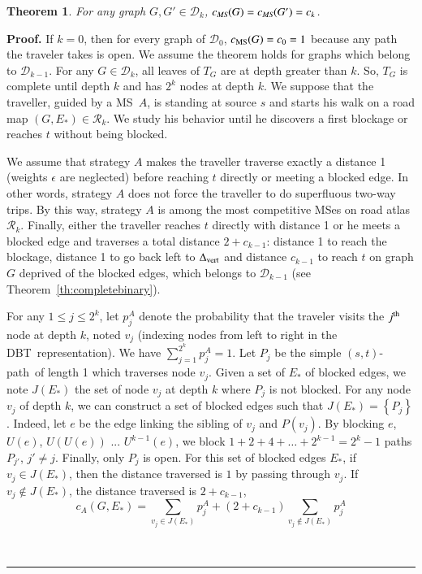 \documentclass[preprint]{elsarticle}
\newtheorem{theorem}{Theorem}
\newenvironment{proof}[1][Proof]{\textbf{#1.} }{\ \rule{0.5em}{0.5em}}
\newcommand{\set}[1]{\left\{ #1 \right\}}
\newcommand{\ith}[1]{#1^{\mbox{\scriptsize{th}}}}
\newcommand{\stpath}{$(s,t)$-path}
\newcommand{\mcalr}{\mathcal{R}}
\newcommand{\mcald}{\mathcal{D}}
\newcommand{\mts}{MS}
\newcommand{\deltavert}{\Delta_{\mbox{\scriptsize{vert}}}}
\newcommand{\cms}{c_{\mbox{\scriptsize{MS}}}}
\newcommand{\ebt}{DBT}
\begin{document}
\begin{theorem}
For any graph $G, G' \in \mcald_k$, $c_{\emph{\scriptsize{MS}}}(G) = c_{\emph{\scriptsize{MS}}}(G') = c_k$.
\label{th:equalcompetitive}
\end{theorem}
\begin{proof}
If $k = 0$, then for every graph of $\mcald_0$, $\cms(G) = c_0 = 1$ because any path the traveler takes is open.
We assume the theorem holds for graphs which belong to $\mcald_{k-1}$. For any $G \in \mcald_k$, all leaves of $T_G$ are at depth greater than $k$. So, $T_G$ is complete until depth $k$ and has $2^k$ nodes at depth $k$. We suppose that the traveller, guided by a \mts ~$A$, is standing at source $s$ and starts his walk on a road map $\left(G,E_*\right) \in \mcalr_k$. We study his behavior until he discovers a first blockage or reaches $t$ without being blocked.

We assume that strategy $A$ makes the traveller traverse exactly a distance 1 (weights $\epsilon$ are neglected) before reaching $t$ directly or meeting a blocked edge. In other words, strategy $A$ does not force the traveller to do superfluous two-way trips. By this way, strategy $A$ is among the most competitive \mts es on road atlas $\mcalr_k$. Finally, either the traveller reaches $t$ directly with distance 1 or he meets a blocked edge and traverses a total distance $2 + c_{k-1}$: distance 1 to reach the blockage, distance 1 to go back left to $\deltavert$ and distance $c_{k-1}$ to reach $t$ on graph $G$ deprived of the blocked edges, which belongs to $\mcald_{k-1}$ (see Theorem~\ref{th:completebinary}).

For any $1 \le j \le 2^k$, let $p_j^A$ denote the probability that the traveler visits the $\ith{j}$ node at depth $k$, noted $v_j$ (indexing nodes from left to right in the \ebt ~representation). We have $\sum_{j=1}^{2^k} p_j^A = 1$. Let $P_j$ be the simple \stpath ~of length 1 which traverses node $v_j$.
Given a set of $E_*$ of blocked edges, we note $J(E_*)$ the set of node $v_j$ at depth $k$ where $P_j$ is not blocked. For any node $v_j$ of depth $k$, we can construct a set of blocked edges such that $J(E_*) = \set{P_j}$. Indeed, let $e$ be the edge linking the sibling of $v_j$ and $P\left(v_j\right)$. By blocking $e$,  $U(e)$, $U(U(e))$ ... $U^{k-1}(e)$, we block $1+2+4+\ldots+2^{k-1} = 2^k - 1$ paths $P_{j'}$, $j' \neq j$. Finally, only $P_j$ is open.
For this set of blocked edges $E_*$, if $v_j \in J(E_*)$, then the distance traversed is $1$ by passing through $v_j$. If $v_j \notin J(E_*)$, the distance traversed is $2 + c_{k-1}$,
\[
c_A(G, E_*) = \sum_{v_j\in J(E_*)} p_j^A+  (2+c_{k-1})\sum_{v_j\notin J(E_*)}p_j^A
\]


\end{proof}
\end{document}
